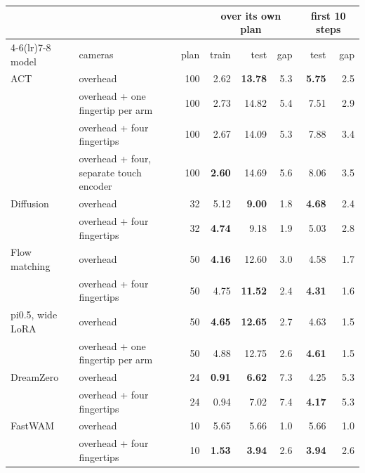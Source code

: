 \begin{tabular}{llrrrrrr}
\toprule
& & & \multicolumn{3}{c}{over its own plan} & \multicolumn{2}{c}{first 10 steps} \\
\cmidrule(lr){4-6}\cmidrule(lr){7-8}
model & cameras & plan & train & test & gap & test & gap \\
\midrule
ACT & overhead & 100 & 2.62 & \textbf{13.78} & 5.3 & \textbf{5.75} & 2.5 \\
 & overhead + one fingertip per arm & 100 & 2.73 & 14.82 & 5.4 & 7.51 & 2.9 \\
 & overhead + four fingertips & 100 & 2.67 & 14.09 & 5.3 & 7.88 & 3.4 \\
 & overhead + four, separate touch encoder & 100 & \textbf{2.60} & 14.69 & 5.6 & 8.06 & 3.5 \\
\midrule
Diffusion & overhead & 32 & 5.12 & \textbf{9.00} & 1.8 & \textbf{4.68} & 2.4 \\
 & overhead + four fingertips & 32 & \textbf{4.74} & 9.18 & 1.9 & 5.03 & 2.8 \\
\midrule
Flow matching & overhead & 50 & \textbf{4.16} & 12.60 & 3.0 & 4.58 & 1.7 \\
 & overhead + four fingertips & 50 & 4.75 & \textbf{11.52} & 2.4 & \textbf{4.31} & 1.6 \\
\midrule
pi0.5, wide LoRA & overhead & 50 & \textbf{4.65} & \textbf{12.65} & 2.7 & 4.63 & 1.5 \\
 & overhead + one fingertip per arm & 50 & 4.88 & 12.75 & 2.6 & \textbf{4.61} & 1.5 \\
\midrule
DreamZero & overhead & 24 & \textbf{0.91} & \textbf{6.62} & 7.3 & 4.25 & 5.3 \\
 & overhead + four fingertips & 24 & 0.94 & 7.02 & 7.4 & \textbf{4.17} & 5.3 \\
\midrule
FastWAM & overhead & 10 & 5.65 & 5.66 & 1.0 & 5.66 & 1.0 \\
 & overhead + four fingertips & 10 & \textbf{1.53} & \textbf{3.94} & 2.6 & \textbf{3.94} & 2.6 \\
\bottomrule
\end{tabular}
